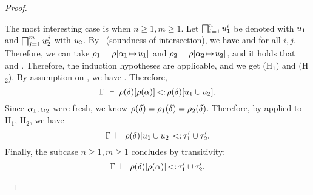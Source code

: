 \begin{proof}
\begin{itemize}
            The most interesting case is when $n \geq 1, m \geq 1$.
            Let $\textstyle\bigsqcap_{i=1}^n u_1^i$ be denoted with $u_1$
            and $\textstyle\bigsqcap_{j=1}^m u_2^j$ with $u_2$.
            By~ (soundness of intersection), we have
             and 
            for all $i, j$. Therefore, we can take 
            $\rho_1 = \rho[\alpha_1\!\mapsto\!u_1]$ and
            $\rho_2 = \rho[\alpha_2\!\mapsto\!u_2]$,
            and it holds that  and
            .
            Therefore, the induction hypotheses are applicable, and we get
             (H$_1$) and
             (H$_2$).
            By assumption on \substvars, we have
            .
            Therefore, \[\Gamma\;\vdash\;\rho(\delta)[\rho(\alpha)] \operatorname{<:} \rho(\delta)[u_1 \cup u_2].\]
            Since $\alpha_1, \alpha_2$ were fresh, we know
            $\rho(\delta) = \rho_1(\delta) = \rho_2(\delta)$.
            Therefore, by  applied to H$_1$, H$_2$, we have
            \[\Gamma\;\vdash\;\rho(\delta)[u_1 \cup u_2] \operatorname{<:} \tau'_1 \cup \tau'_2.\]
            Finally, the subcase $n \geq 1, m \geq 1$ concludes by transitivity:
            \[\Gamma\;\vdash\;\rho(\delta)[\rho(\alpha)] \operatorname{<:} \tau'_1 \cup \tau'_2.\]
    \end{itemize}
\end{proof}

